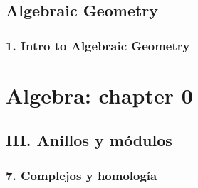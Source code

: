 \documentclass[11pt]{article}
\begin{document}
\subsection*{Algebraic Geometry}
\label{sec-3-3}
\subsubsection*{1. Intro to Algebraic Geometry}
\label{sec-3-3-1}
\section*{Algebra: chapter 0}
\label{sec-4}
\subsection*{III. Anillos y módulos}
\label{sec-4-1}
\subsubsection*{7. Complejos y homología}
\label{sec-4-1-1}
\end{document}
